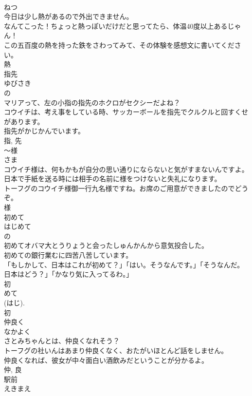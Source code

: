 \documentclass[8pt]{extreport}
\begin{document}
\begin{CJK}{UTF8}{min}
\\	ねつ	
\\	今日は少し熱があるので外出できません。	
\\	なんてこった！ちょっと熱っぽいだけだと思ってたら、体温40度以上あるじゃん！	
\\	この五百度の熱を持った鉄をさわってみて、その体験を感想文に書いてください。	
\\	熱	
\\	指先	
\\	ゆびさき	
\\	の 
\\	マリアって、左の小指の指先のホクロがセクシーだよね？	
\\	コウイチは、考え事をしている時、サッカーボールを指先でクルクルと回すくせがあります。	
\\	指先がかじかんでいます。	
\\	指, 先	
\\	〜様	
\\	さま	
\\	コウイチ様は、何もかもが自分の思い通りにならないと気がすまないんですよ。	
\\	日本で手紙を送る時には相手の名前に様をつけないと失礼になります。	
\\	トーフグのコウイチ様御一行九名様ですね。お席のご用意ができましたのでどうぞ。	
\\	様	
\\	初めて	
\\	はじめて	
\\	の 
\\	初めてオバマ大とうりょうと会ったしゅんかんから意気投合した。	
\\	初めての銀行業むに四苦八苦しています。	
\\	「もしかして、日本はこれが初めて？」「はい。そうなんです。」「そうなんだ。日本はどう？」「かなり気に入ってるわ。」	
\\	初 
\\	めて 
\\	(はじ). 
\\	初	
\\	仲良く	
\\	なかよく	
\\	さとみちゃんとは、仲良くなれそう？	
\\	トーフグの社いんはあまり仲良くなく、おたがいほとんど話をしません。	
\\	仲良くなれば、彼女が中々面白い酒飲みだということが分かるよ。	
\\	仲, 良	
\\	駅前	
\\	えきまえ	

\end{CJK}
\end{document}
